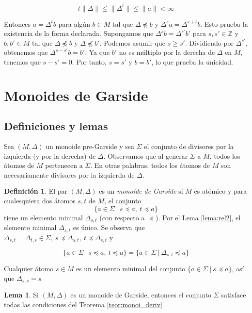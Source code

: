 \documentclass[12pt]{article}
\theoremstyle{definition}
\newtheorem{defi}{Definición}[section]
\newtheorem{lema}{Lema}[section]
\providecommand{\norm}[1]{\lVert#1\rVert}
\begin{document}
$$t\norm{\Delta}\leq \norm{\Delta^t}\leq \norm{a}<\infty$$

Entonces $a=\Delta^t b$ para algún $b\in M$ tal que $\Delta\npreceq b$ y $\Delta^s a=\Delta^{s+t} b$. Esto prueba la existencia de la forma declarada.
\newline
\newline
Supongamos que $\Delta^s b=\Delta^{s'}b'$ para $s,s'\in\mathbb{Z}$ y $b,b'\in M$ tal que $\Delta\npreceq b$ y $\Delta\npreceq b'$. Podemos asumir que $s\geq s'$. Dividiendo por $\Delta^{s'}$, obtenemos que $\Delta^{s-s'}b=b'$. Ya que $b'$ no es múltiplo por la derecha de $\Delta$ en $M$, tenemos que $s-s'=0$. Por tanto, $s=s'$ y $b=b'$, lo que prueba la unicidad.

\section{Monoides de Garside}
\subsection{Definiciones y lemas}

Sea $(M,\Delta)$ un monoide pre-Garside y sea $\Sigma$ el conjunto de divisores por la izquierda (y por la derecha) de $\Delta$. Observamos que al generar $\Sigma$ a $M$, todos los átomos de $M$ pertenecen a $\Sigma$. En otras palabras, todos los átomos de $M$ son necesariamente divisores por la izquierda de $\Delta$.

\begin{defi}
El par $(M,\Delta)$ es un \textit{monoide de Garside} si $M$ es atómico y para cualesquiera dos átomos $s,t$ de $M$, el conjunto
$$\{a\in\Sigma\ |\ s\preceq a,\ t\preceq a \}$$
\newline
tiene un elemento minimal $\Delta_{s,t}$ (con respecto a $\preceq$).
\newline
\newline
Por el Lema \ref{lema:rel2}, el elemento minimal $\Delta_{s,t}$ es único. Se observa que $\Delta_{s,t}=\Delta_{t,s}\in\Sigma,\ s\preceq\Delta_{s,t},\ t\preceq\Delta_{s,t}$ y 

$$\{a\in\Sigma\ |\ s\preceq a,\ t\preceq a \}=\{a\in\Sigma\ |\ \Delta_{s,t}\preceq a\}$$

Cualquier átomo $s\in M$ es un elemento minimal del conjunto $\{a\in\Sigma\ |\ s\preceq a\}$, así que $\Delta_{s,s}=s$

\end{defi}

\begin{lema}
Si $(M,\Delta)$ es un monoide de Garside, entonces el conjunto $\Sigma$ satisface todas las condiciones del Teorema \ref{teor:monoi_deriv}
\label{lema:garside}
\end{lema}
\end{document}
